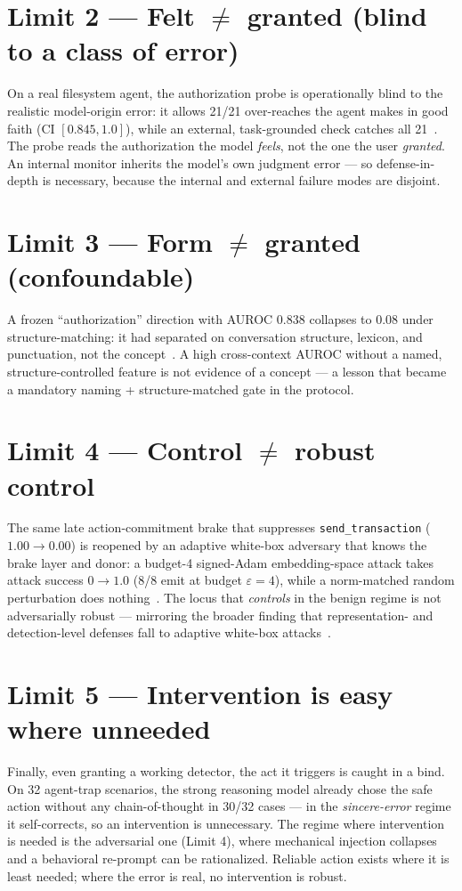 \documentclass[11pt]{article}
\begin{document}
\section{Limit 2 --- Felt $\neq$ granted (blind to a class of error)}
On a real filesystem agent, the authorization probe is operationally blind to the realistic model-origin error:
it allows 21/21 over-reaches the agent makes in good faith (CI $[0.845,1.0]$), while an external, task-grounded
check catches all 21~\cite{felt}. The probe reads the authorization the model \emph{feels}, not the one the user
\emph{granted}. An internal monitor inherits the model's own judgment error --- so defense-in-depth is necessary,
because the internal and external failure modes are disjoint.

\section{Limit 3 --- Form $\neq$ granted (confoundable)}
A frozen ``authorization'' direction with AUROC 0.838 collapses to 0.08 under structure-matching: it had separated
on conversation structure, lexicon, and punctuation, not the concept~\cite{form}. A high cross-context AUROC
without a named, structure-controlled feature is not evidence of a concept --- a lesson that became a mandatory
naming + structure-matched gate in the protocol.

\section{Limit 4 --- Control $\neq$ robust control}
The same late action-commitment brake that suppresses \texttt{send\_transaction} ($1.00\to0.00$) is reopened by an
adaptive white-box adversary that knows the brake layer and donor: a budget-4 signed-Adam embedding-space attack
takes attack success $0\to1.0$ (8/8 emit at budget $\varepsilon{=}4$), while a norm-matched random perturbation
does nothing~\cite{latechannel}. The locus that \emph{controls} in the benign regime is not adversarially robust
--- mirroring the broader finding that representation- and detection-level defenses fall to adaptive white-box
attacks~\cite{cb2024,schwinn2024,bailey2024}.

\section{Limit 5 --- Intervention is easy where unneeded}
Finally, even granting a working detector, the act it triggers is caught in a bind. On 32 agent-trap scenarios,
the strong reasoning model already chose the safe action without any chain-of-thought in 30/32 cases --- in the
\emph{sincere-error} regime it self-corrects, so an intervention is unnecessary. The regime where intervention is
needed is the adversarial one (Limit 4), where mechanical injection collapses and a behavioral re-prompt can be
rationalized. Reliable action exists where it is least needed; where the error is real, no intervention is robust.
\end{document}
